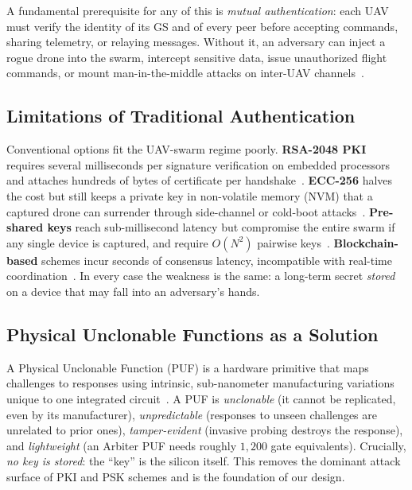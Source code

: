 \documentclass[11pt,a4paper]{article}
\begin{document}
A fundamental prerequisite for any of this is \emph{mutual authentication}:
each UAV must verify the identity of its GS and of every peer before accepting
commands, sharing telemetry, or relaying messages. Without it, an adversary
can inject a rogue drone into the swarm, intercept sensitive data, issue
unauthorized flight commands, or mount man-in-the-middle attacks on inter-UAV
channels~\cite{puf_uav_cross_domain}.

\subsection{Limitations of Traditional Authentication}

Conventional options fit the UAV-swarm regime poorly. \textbf{RSA-2048 PKI}
requires several milliseconds per signature verification on embedded
processors and attaches hundreds of bytes of certificate per
handshake~\cite{puf_lightweight_uav}. \textbf{ECC-256} halves the cost but
still keeps a private key in non-volatile memory (NVM) that a captured drone
can surrender through side-channel or cold-boot
attacks~\cite{peer2peer_auth}. \textbf{Pre-shared keys} reach sub-millisecond
latency but compromise the entire swarm if any single device is captured, and
require $O(N^2)$ pairwise keys~\cite{puf_iot_strong_adversary}.
\textbf{Blockchain-based} schemes incur seconds of consensus latency,
incompatible with real-time coordination~\cite{puf_ntu}. In every case the
weakness is the same: a long-term secret \emph{stored} on a device that may
fall into an adversary's hands.

\subsection{Physical Unclonable Functions as a Solution}

A Physical Unclonable Function (PUF) is a hardware primitive that maps
challenges to responses using intrinsic, sub-nanometer manufacturing
variations unique to one integrated circuit~\cite{puf_overview}. A PUF is
\emph{unclonable} (it cannot be replicated, even by its manufacturer),
\emph{unpredictable} (responses to unseen challenges are unrelated to prior
ones), \emph{tamper-evident} (invasive probing destroys the response), and
\emph{lightweight} (an Arbiter PUF needs roughly $1{,}200$ gate equivalents).
Crucially, \emph{no key is stored}: the ``key'' is the silicon itself. This
removes the dominant attack surface of PKI and PSK schemes and is the
foundation of our design.
\end{document}
